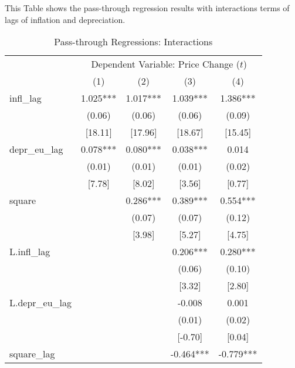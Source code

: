 \clearpage
\begin{table}
\caption{Pass-through Regressions: Interactions}\label{tbl:inter}
{\small This Table shows the pass-through regression results with interactions terms of lags of inflation and depreciation.
	
	\begin{tabular}{lcccc}
		\hline\hline
		                   & \multicolumn{4}{c}{Dependent Variable: Price Change ($ t $)} \\
		                   &    (1)    &    (2)    &    (3)    &           (4)            \\ \hline
		infl\_lag          & 1.025***  & 1.017***  & 1.039***  &         1.386***         \\
		                   &  (0.06)   &  (0.06)   &  (0.06)   &          (0.09)          \\
		                   &  [18.11]  &  [17.96]  &  [18.67]  &         [15.45]          \\
		depr\_eu\_lag      & 0.078***  & 0.080***  & 0.038***  &          0.014           \\
		                   &  (0.01)   &  (0.01)   &  (0.01)   &          (0.02)          \\
		                   &  [7.78]   &  [8.02]   &  [3.56]   &          [0.77]          \\ \hline
		square             &           & 0.286***  & 0.389***  &         0.554***         \\
		                   &           &  (0.07)   &  (0.07)   &          (0.12)          \\
		                   &           &  [3.98]   &  [5.27]   &          [4.75]          \\
		L.infl\_lag        &           &           & 0.206***  &         0.280***         \\
		                   &           &           &  (0.06)   &          (0.10)          \\
		                   &           &           &  [3.32]   &          [2.80]          \\
		L.depr\_eu\_lag    &           &           &  -0.008   &          0.001           \\
		                   &           &           &  (0.01)   &          (0.02)          \\
		                   &           &           &  [-0.70]  &          [0.04]          \\
		square\_lag        &           &           & -0.464*** &        -0.779***         \\

\end{tabular}}
\end{table}
